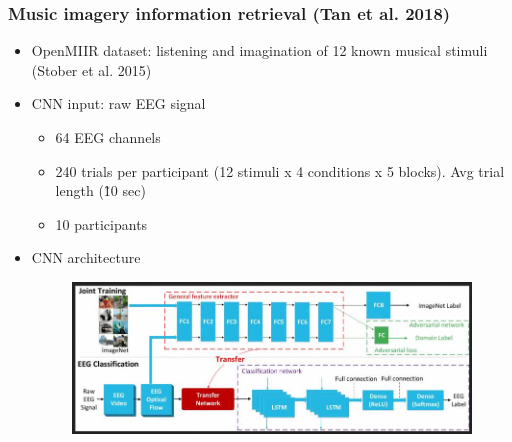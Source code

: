 \documentclass{beamer}
\begin{document}
\begin{frame}
	\frametitle{Music imagery information retrieval (Tan et al. 2018)}
	
	\begin{itemize}

		\item OpenMIIR dataset: listening and imagination of 12 known musical stimuli (Stober et al. 2015)

		\item CNN input: raw EEG signal 
		\begin{itemize}
			\item 64 EEG channels
			\item 240 trials per participant (12 stimuli x 4 conditions x 5 blocks). Avg trial length (\~10 sec)
			\item 10 participants
		\end{itemize}
		
		\item CNN architecture
		\begin{figure}
			\centering
			\includegraphics[scale=0.475]{fig9.jpg}
		\end{figure}

	\end{itemize}

\end{frame}
	
\end{document}
